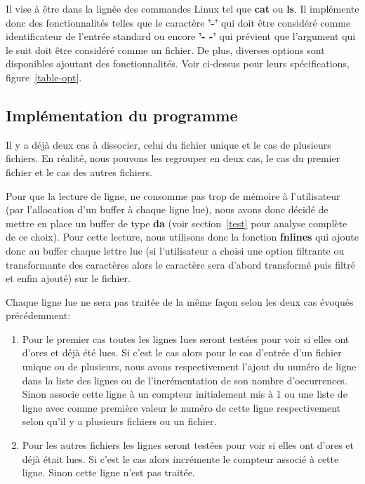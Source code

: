 \documentclass[12pt]{article}
\begin{document}
    Il vise à être dans la lignée des commandes Linux tel que \textbf{cat} ou 
    \textbf{ls}. Il implémente donc des fonctionnalités telles que le caractère 
    \textbf{'-'} qui doit être considéré comme identificateur de l'entrée 
    standard ou encore \textbf{'- -'} qui prévient que l'argument qui le suit 
    doit être considéré comme un fichier. De plus, diverses options sont 
    disponibles ajoutant des fonctionnalités. Voir ci-dessus pour leurs 
    spécifications, figure~\ref{table-opt}.

    \subsection{Implémentation du programme}
    Il y a déjà deux cas à dissocier, celui du fichier unique et le cas de 
    plusieurs fichiers. En réalité, nous pouvons les regrouper en deux 
    cas, le cas du premier fichier et le cas des autres fichiers.

    Pour que la lecture de ligne, ne consomme pas trop de mémoire à l'utilisateur
    (par l'allocation d'un buffer à chaque ligne lue), nous avons donc décidé de 
    mettre en place un buffer de type \textbf{da} (voir section~\ref{test} pour
    analyse complète de ce choix). Pour cette lecture, nous utilisons donc la
    fonction \textbf{fnlines} qui ajoute donc au buffer chaque lettre lue (si 
    l'utilisateur a choisi une option filtrante ou transformante des caractères 
    alors le caractère sera d'abord transformé puis filtré et enfin ajouté) 
    sur le fichier.

    Chaque ligne lue ne sera pas traitée de la même façon selon les deux cas 
    évoqués précédemment\@:

    \begin{enumerate}
        \item[] Pour le premier cas toutes les lignes lues seront testées pour 
        voir si elles ont d'ores et déjà été lues. Si c'est le cas alors pour le 
        cas d'entrée d'un fichier unique ou de plusieurs, nous avons 
        respectivement l'ajout du numéro de ligne dans la liste des lignes ou 
        de l'incrémentation de son nombre d'occurrences. Sinon associe cette 
        ligne à  un compteur initialement mis à 1 ou une liste de 
        ligne avec comme première valeur le numéro de cette ligne respectivement 
        selon qu'il y a plusieurs fichiers ou un fichier.
        \item[] Pour les autres fichiers les lignes seront testées pour voir si 
        elles ont d'ores et déjà était lues. Si c'est le cas alors incrémente le 
        compteur associé à cette ligne. Sinon cette ligne n'est pas traitée.
    \end{enumerate}
\end{document}
